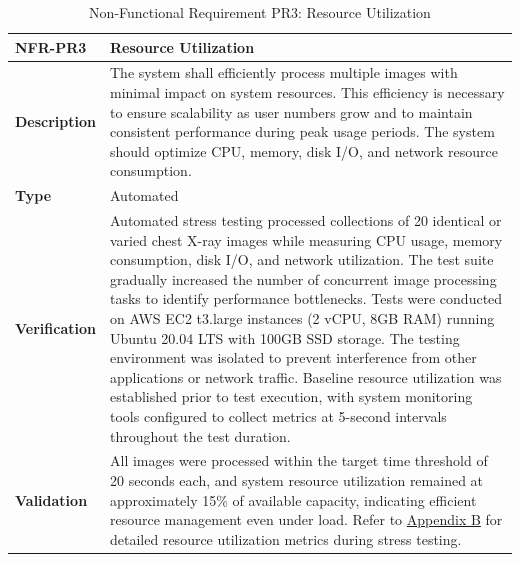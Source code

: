 \documentclass[12pt, titlepage]{article}
\begin{document}
\begin{table}[H]
\centering
{}
\begin{tabular}{|p{3.5cm}|p{11.5cm}|}
\hline
\rowcolor{gray!30}
\textbf{NFR-PR3} & \textbf{Resource Utilization} \\
\hline
\textbf{Description} & The system shall efficiently process multiple images with minimal impact on system resources. This efficiency is necessary to ensure scalability as user numbers grow and to maintain consistent performance during peak usage periods. The system should optimize CPU, memory, disk I/O, and network resource consumption. \\
\hline
\textbf{Type} & Automated \\
\hline
\textbf{Verification} & Automated stress testing processed collections of 20 identical or varied chest X-ray images while measuring CPU usage, memory consumption, disk I/O, and network utilization. The test suite gradually increased the number of concurrent image processing tasks to identify performance bottlenecks. Tests were conducted on AWS EC2 t3.large instances (2 vCPU, 8GB RAM) running Ubuntu 20.04 LTS with 100GB SSD storage. The testing environment was isolated to prevent interference from other applications or network traffic. Baseline resource utilization was established prior to test execution, with system monitoring tools configured to collect metrics at 5-second intervals throughout the test duration. \\
\hline
\textbf{Validation} & All images were processed within the target time threshold of 20 seconds each, and system resource utilization remained at approximately 15\% of available capacity, indicating efficient resource management even under load. Refer to \hyperref[appendix:B]{Appendix B} for detailed resource utilization metrics during stress testing. \\
\hline
\end{tabular}
\caption{Non-Functional Requirement PR3: Resource Utilization}
\end{table}
\end{document}
